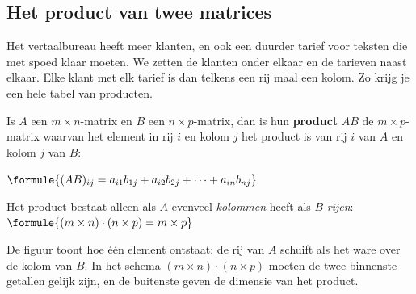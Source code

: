 \subsection{Het product van twee matrices}

Het vertaalbureau heeft meer klanten, en ook een duurder tarief voor teksten die met spoed klaar moeten. We zetten de klanten onder elkaar en de tarieven naast elkaar. Elke klant met elk tarief is dan telkens een rij maal een kolom. Zo krijg je een hele tabel van producten.

\begin{theorie}
Is $A$ een $m \times n$-matrix en $B$ een $n \times p$-matrix, dan is hun \textbf{\textcolor{accent}{product}} $AB$ de $m \times p$-matrix waarvan het element in rij $i$ en kolom $j$ het product is van rij $i$ van $A$ en kolom $j$ van $B$:

\vspace{1mm}
\qquad $\formule{(AB)_{ij} = a_{i1} b_{1j} + a_{i2} b_{2j} + \cdots + a_{in} b_{nj}}$

\vspace{2mm}
Het product bestaat alleen als $A$ evenveel \emph{kolommen} heeft als $B$ \emph{rijen}: \quad $\formule{(m \times n) \cdot (n \times p) = m \times p}$
\end{theorie}


De figuur toont hoe één element ontstaat: de rij van $A$ schuift als het ware over de kolom van $B$. In het schema $(m \times n) \cdot (n \times p)$ moeten de twee binnenste getallen gelijk zijn, en de buitenste geven de dimensie van het product.

